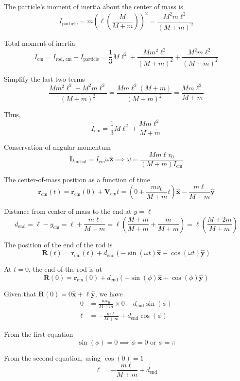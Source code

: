 \documentclass[12pt]{article}
\begin{document}
The particle's moment of inertia about the center of mass is
\[
I_{\text{particle}} = m \left( \ell \left( \frac{M}{M + m} \right) \right)^2 = \frac{M^2 m \ell^2}{(M + m)^2}
\]

Total moment of inertia
\[
I_{\text{cm}} = I_{\text{rod, cm}} + I_{\text{particle}} = \frac{1}{3} M \ell^2 + \frac{M m^2 \ell^2}{(M + m)^2} + \frac{M^2 m \ell^2}{(M + m)^2}
\]

Simplify the last two terms
\[
\frac{M m^2 \ell^2 + M^2 m \ell^2}{(M + m)^2} = \frac{M m \ell^2 (M + m)}{(M + m)^2} = \frac{M m \ell^2}{M + m}
\]

Thus,
\[
I_{\text{cm}} = \frac{1}{3} M \ell^2 + \frac{M m \ell^2}{M + m}
\]


Conservation of angular momentum
\[
\mathbf{L}_{\text{initial}} = I_{\text{cm}} \omega \hat{\mathbf{z}} \implies \omega = \frac{M m \ell v_0}{(M + m) I_{\text{cm}}}
\]


The center-of-mass position as a function of time
\[
\mathbf{r}_{\text{cm}}(t) = \mathbf{r}_{\text{cm}}(0) + \mathbf{V}_{\text{cm}} t = \left( 0 + \frac{m v_0}{M + m} t \right) \hat{\mathbf{x}} - \frac{m \ell}{M + m} \hat{\mathbf{y}}
\]

Distance from center of mass to the end at $y = \ell$
\[
d_{\text{end}} = \ell - y_{\text{cm}} = \ell + \frac{m \ell}{M + m} = \ell \left( \frac{M + m}{M + m} + \frac{m}{M + m} \right) = \ell \left( \frac{M + 2m}{M + m} \right)
\]

The position of the end of the rod is
\[
\mathbf{R}(t) = \mathbf{r}_{\text{cm}}(t) + d_{\text{end}} \left( -\sin(\omega t) \hat{\mathbf{x}} + \cos(\omega t) \hat{\mathbf{y}} \right)
\]


At $t = 0$, the end of the rod is at
\[
\mathbf{R}(0) = \mathbf{r}_{\text{cm}}(0) + d_{\text{end}} \left( -\sin(\phi) \hat{\mathbf{x}} + \cos(\phi) \hat{\mathbf{y}} \right)
\]

Given that $\mathbf{R}(0) = 0 \hat{\mathbf{x}} + \ell \hat{\mathbf{y}}$, we have
\begin{align*}
0 &= \frac{m v_0}{M + m} \times 0 - d_{\text{end}} \sin(\phi)\\
\ell &= -\frac{m \ell}{M + m} + d_{\text{end}} \cos(\phi)
\end{align*}

From the first equation
\[
\sin(\phi) = 0 \implies \phi = 0 \text{ or } \phi = \pi
\]

From the second equation, using $\cos(0) = 1$
\[
\ell = -\frac{m \ell}{M + m} + d_{\text{end}}
\]
\end{document}
